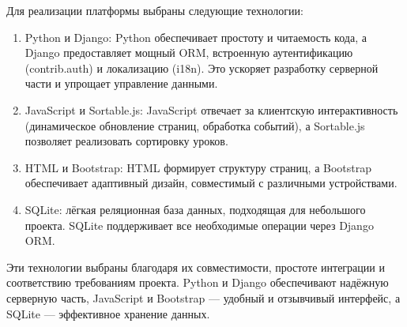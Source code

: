 Для реализации платформы выбраны следующие технологии:
\begin{enumerate}
	\item {Python и Django}: Python обеспечивает простоту и читаемость кода, а Django предоставляет мощный ORM, встроенную аутентификацию (contrib.auth) и локализацию (i18n). Это ускоряет разработку серверной части и упрощает управление данными.
	\item {JavaScript и Sortable.js}: JavaScript отвечает за клиентскую интерактивность (динамическое обновление страниц, обработка событий), а Sortable.js позволяет реализовать сортировку уроков.
	\item {HTML и Bootstrap}: HTML формирует структуру страниц, а Bootstrap обеспечивает адаптивный дизайн, совместимый с различными устройствами.
	\item {SQLite}: лёгкая реляционная база данных, подходящая для небольшого проекта. SQLite поддерживает все необходимые операции через Django ORM.
\end{enumerate}

Эти технологии выбраны благодаря их совместимости, простоте интеграции и соответствию требованиям проекта. Python и Django обеспечивают надёжную серверную часть, JavaScript и Bootstrap — удобный и отзывчивый интерфейс, а SQLite — эффективное хранение данных.



